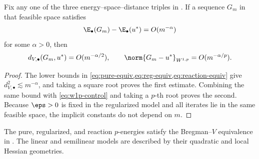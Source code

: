 \begin{corollary}
\label{cor:metric-rates}
Fix any one of the three energy--space--distance triples in . If a sequence
\(G_m\) in that feasible space satisfies
 \begin{equation}
 \E_\bullet(G_m)-\E_\bullet(u^*)=O(m^{-\alpha})
 \label{eq:assumed-energy-rate}
 \end{equation}
for some \(\alpha>0\), then
 \begin{equation}
 d_{V,\bullet}(G_m,u^*)=O(m^{-\alpha/2}),
 \qquad
 \norm{G_m-u^*}_{W^{1,p}}=O(m^{-\alpha/p}).
\label{eq:metric-rates}
 \end{equation}
\end{corollary}

\begin{proof}
The lower bounds in \cref{eq:pure-equiv,eq:reg-equiv,eq:reaction-equiv} give
\(d_{V,\bullet}^2\lesssim m^{-\alpha}\), and taking a square root proves the first estimate. Combining
the same bound with \cref{eq:w1p-control} and taking a \(p\)-th root proves the second. Because
\(\eps>0\) is fixed in the regularized model and all iterates lie in the same feasible space, the
implicit constants do not depend on \(m\).
\end{proof}

\begin{remark}
The pure, regularized, and reaction \(p\)-energies satisfy the Bregman--\(V\) equivalence in . The linear and semilinear models are described by their quadratic and local Hessian geometries.
\end{remark}

